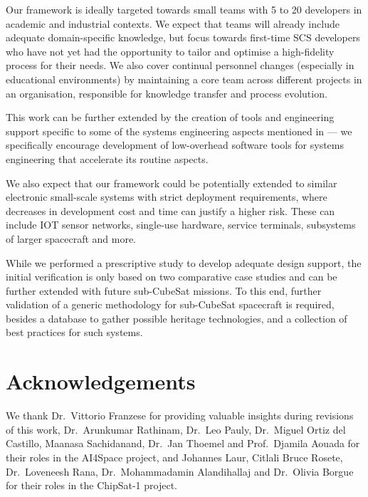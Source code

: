 \documentclass[journal,10pt]{IEEEtran}
\begin{document}
	Our framework is ideally targeted towards small teams with 5 to 20 developers in academic and industrial contexts. We expect that teams will already include adequate domain-specific knowledge, but focus towards first-time SCS developers who have not yet had the opportunity to tailor and optimise a high-fidelity process for their needs. We also cover continual personnel changes (especially in educational environments) by maintaining a core team across different projects in an organisation, responsible for knowledge transfer and process evolution.%

This work can be further extended by the creation of tools and engineering support specific to some of the systems engineering aspects mentioned in  --- we specifically encourage development of low-overhead software tools for systems engineering that accelerate its routine aspects.


We also expect that our framework could be potentially extended to similar electronic small-scale systems with strict deployment requirements, where decreases in development cost and time can justify a higher risk. These can include \mbox{\ac{IOT}} sensor networks, single-use hardware, service terminals, subsystems of larger spacecraft and more.

While we performed a prescriptive study to develop adequate design support, the initial verification is only based on two comparative case studies and can be further extended with future sub-CubeSat missions. To this end, further validation of a generic methodology for sub-CubeSat spacecraft is required, besides a database to gather possible heritage technologies, and a collection of best practices for such systems.



\section*{Acknowledgements}

We thank Dr.~Vittorio Franzese for providing valuable insights during revisions of this work, Dr.~Arunkumar Rathinam, Dr.~Leo Pauly, Dr.~Miguel Ortiz del Castillo, Maanasa Sachidanand, Dr.~Jan Thoemel and Prof.~Djamila Aouada for their roles in the AI4Space project, and Johannes Laur, Citlali Bruce Rosete, Dr.~Loveneesh Rana, Dr.~Mohammadamin Alandihallaj and Dr.~Olivia Borgue for their roles in the ChipSat-1 project.

\newpage
\end{document}
